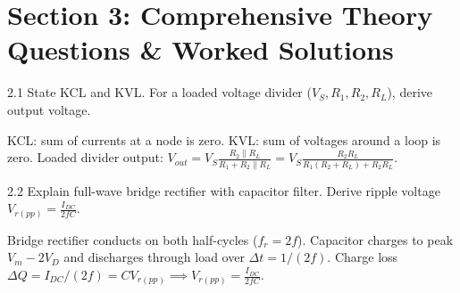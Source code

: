 \newpage
\section{Section 3: Comprehensive Theory Questions \& Worked Solutions}
\begin{theoryq}{2.1}
State KCL and KVL. For a loaded voltage divider ($V_S, R_1, R_2, R_L$), derive output voltage.
\end{theoryq}

\begin{theorysol}
KCL: sum of currents at a node is zero. KVL: sum of voltages around a loop is zero. Loaded divider output: $V_{out} = V_S \frac{R_2 \parallel R_L}{R_1 + R_2 \parallel R_L} = V_S \frac{R_2 R_L}{R_1(R_2+R_L) + R_2 R_L}$.
\end{theorysol}

\vspace{3mm}

\begin{theoryq}{2.2}
Explain full-wave bridge rectifier with capacitor filter. Derive ripple voltage $V_{r(pp)} = \frac{I_{DC}}{2fC}$.
\end{theoryq}

\begin{theorysol}
Bridge rectifier conducts on both half-cycles ($f_r = 2f$). Capacitor charges to peak $V_m - 2V_D$ and discharges through load over $\Delta t = 1/(2f)$. Charge loss $\Delta Q = I_{DC}/(2f) = C V_{r(pp)} \implies V_{r(pp)} = \frac{I_{DC}}{2fC}$.
\end{theorysol}

\vspace{3mm}

